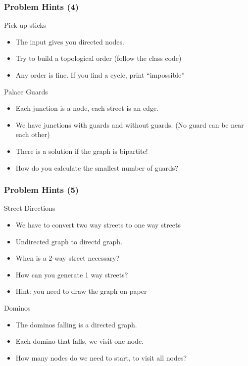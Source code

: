 \begin{frame}
  \frametitle{Problem Hints (4)}
  {\smaller
  \begin{block}{Pick up sticks}
    \begin{itemize}
    \item The input gives you directed nodes. 
    \item Try to build a topological order (follow the class code)
    \item Any order is fine. If you find a cycle, print ``impossible''
    \end{itemize}
  \end{block}
  \begin{block}{Palace Guards}
    \begin{itemize}
    \item Each junction is a node, each street is an edge. 
    \item We have junctions with guards and without guards. (No guard can be near each other)
    \item There is a solution if the graph is bipartite!
    \item How do you calculate the smallest number of guards?
    \end{itemize}
  \end{block}}
\end{frame}

\begin{frame}
  \frametitle{Problem Hints (5)}
  {\smaller
  \begin{block}{Street Directions}
    \begin{itemize}
    \item We have to convert two way streets to one way streets 
    \item Undirected graph to directd graph. 
    \item When is a 2-way street \alert{necessary}?
    \item How can you generate 1 way streets?
    \item Hint: you need to draw the graph on paper
    \end{itemize}
  \end{block}
  \begin{block}{Dominos}
    \begin{itemize}
    \item The dominos falling is a directed graph. 
    \item Each domino that falls, we visit one node.
    \item How many nodes do we need to start, to visit all nodes?
    \end{itemize}
  \end{block}}
\end{frame}

